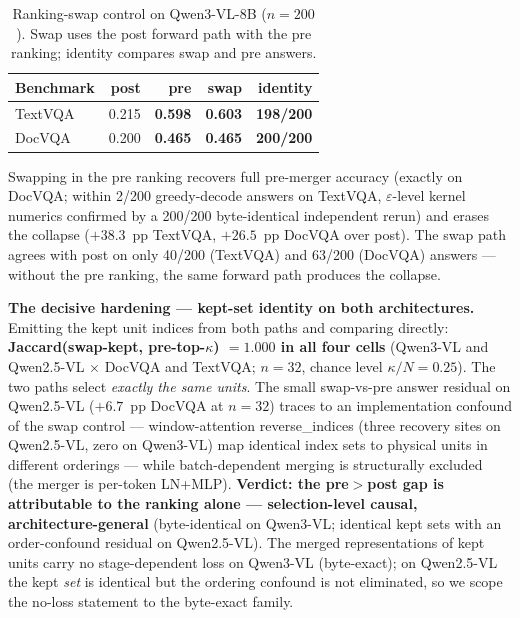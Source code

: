 \documentclass[sigconf,review,anonymous]{acmart}
\begin{document}
\begin{table}[t]
  \centering
  \small
  \setlength{\tabcolsep}{3.5pt}
  \caption{Ranking-swap control on Qwen3-VL-8B ($n=200$). Swap uses the post
    forward path with the pre ranking; identity compares swap and pre answers.}
  \label{tab:swap}
  \begin{tabular}{@{}l r r r r@{}}
    \toprule
    Benchmark & post & \textbf{pre} & \textbf{swap} & identity \\
    \midrule
    TextVQA & 0.215 & \textbf{0.598} & \textbf{0.603} & \textbf{198/200} \\
    DocVQA  & 0.200 & \textbf{0.465} & \textbf{0.465} & \textbf{200/200} \\
    \bottomrule
  \end{tabular}
\end{table}

Swapping in the pre ranking recovers full pre-merger accuracy (exactly on
DocVQA; within 2/200 greedy-decode answers on TextVQA, $\varepsilon$-level
kernel numerics confirmed by a 200/200 byte-identical independent rerun) and
erases the collapse ($+38.3$~pp TextVQA, $+26.5$~pp DocVQA over post). The swap
path agrees with post on only 40/200 (TextVQA) and 63/200 (DocVQA) answers ---
without the pre ranking, the same forward path produces the collapse.

\textbf{The decisive hardening --- kept-set identity on both architectures.}
Emitting the kept unit indices from both paths and comparing directly:
\textbf{Jaccard(swap-kept, pre-top-$\kappa$) $= 1.000$ in all four cells}
(Qwen3-VL and Qwen2.5-VL $\times$ DocVQA and TextVQA; $n = 32$, chance level
$\kappa/N = 0.25$). The two paths select \emph{exactly the same units}. The
small swap-vs-pre answer residual on Qwen2.5-VL ($+6.7$~pp DocVQA at $n = 32$)
traces to an implementation confound of the swap control --- window-attention
reverse\_indices (three recovery sites on Qwen2.5-VL, zero on Qwen3-VL) map
identical index sets to physical units in different orderings --- while
batch-dependent merging is structurally excluded (the merger is per-token
LN+MLP). \textbf{Verdict: the pre$>$post gap is attributable to the ranking
alone --- selection-level causal, architecture-general} (byte-identical on
Qwen3-VL; identical kept sets with an order-confound residual on Qwen2.5-VL).
The merged representations of kept units carry no stage-dependent loss on
Qwen3-VL (byte-exact); on Qwen2.5-VL the kept \emph{set} is identical but the
ordering confound is not eliminated, so we scope the no-loss statement to the
byte-exact family.
\end{document}
